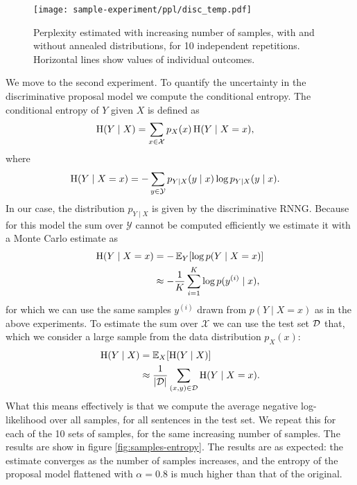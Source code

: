     \begin{figure}[h]
      \center
    	\texttt{[image: sample-experiment/ppl/disc\_temp.pdf]}
    \caption{Perplexity estimated with increasing number of samples, with and without annealed distributions, for 10 independent repetitions. Horizontal lines show values of individual outcomes.}
    \label{fig:samples-perplexities}
    \end{figure}

    We move to the second experiment. To quantify the uncertainty in the discriminative proposal model we compute the conditional entropy. The conditional entropy of $Y$ given $X$ is defined as
    \begin{align*}
      \operatorname{H}(Y \mid X) &= \sum_{x \in \mathcal{X}} p_X(x) \operatorname{H}(Y \mid X = x),
    \end{align*}
    where
    \begin{align*}
      \operatorname{H}(Y \mid X = x)
        &= - \sum_{y \in \mathcal{Y}} p_{Y \mid X}(y \mid x) \log p_{Y \mid X}(y \mid x).
    \end{align*}
    In our case, the distribution $p_{Y \mid X}$ is given by the discriminative RNNG. Because for this model the sum over $\mathcal{Y}$ cannot be computed efficiently we estimate it with a Monte Carlo estimate as
    \begin{align*}
      \operatorname{H}(Y \mid X = x)
        &= - \operatorname{\mathbb{E}}_Y [ \log p(Y \mid X = x)]  \\
        &\approx - \frac{1}{K} \sum_{i=1}^K \log p(y^{(i)} \mid x),
    \end{align*}
    for which we can use the same samples $y^{(i)}$ drawn from $p(Y \mid X = x)$ as in the above experiments. To estimate the sum over $\mathcal{X}$ we can use the test set $\mathcal{D}$ that, which we consider a large sample from the data distribution $p_X(x)$:
    \begin{align*}
      \operatorname{H}(Y \mid X)
        &= \operatorname{\mathbb{E}}_X [ \operatorname{H}(Y \mid X) ]  \\
        &\approx \frac{1}{\lvert \mathcal{D} \rvert} \sum_{ (x, y) \in \mathcal{D} } \operatorname{H}(Y \mid X = x).  \\
    \end{align*}
    What this means effectively is that we compute the average negative log-likelihood over all samples, for all sentences in the test set. We repeat this for each of the 10 sets of samples, for the same increasing number of samples. The results are show in figure \ref{fig:samples-entropy}. The results are as expected: the estimate converges as the number of samples increases, and the entropy of the proposal model flattened with $\alpha = 0.8$ is much higher than that of the original.

